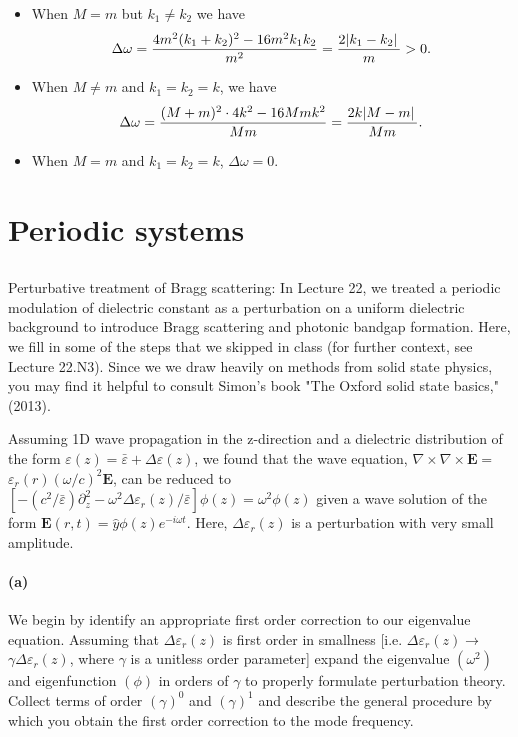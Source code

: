 \documentclass[hyperref, a4paper]{article}
\begin{document}
\begin{itemize}
    \item When $M = m$ but $k_1 \neq k_2$ we have 
    \begin{equation}
        \Delta \omega = \frac{
            4m^2 (k_1 + k_2)^2 - 16 m^2 k_1 k_2
        }{m^2}
        = \frac{2 \abs*{k_1 - k_2}}{m} > 0.
    \end{equation}
    \item When $M \neq m$ and $k_1 = k_2 = k$, we have 
    \begin{equation}
        \Delta \omega = \frac{
            (M + m)^2 \cdot 4 k^2 - 16 Mm k^2
        }{Mm} = \frac{2 k \abs*{M - m}}{Mm}.
    \end{equation}
    \item When $M = m$ and $k_1 = k_2 = k$, $\Delta \omega = 0$.
\end{itemize}

\section{Periodic systems}

\subsection{}

Perturbative treatment of Bragg scattering: In Lecture 22, we treated a periodic modulation of dielectric constant as a perturbation on a uniform dielectric background to introduce Bragg scattering and photonic bandgap formation. Here, we fill in some of the steps that we skipped in class (for further context, see Lecture 22.N3). Since we we draw heavily on methods from solid state physics, you may find it helpful to consult Simon's book "The Oxford solid state basics," (2013).

Assuming 1D wave propagation in the z-direction and a dielectric distribution of the form $\varepsilon(z)=\bar{\varepsilon}+\Delta \varepsilon(z)$, we found that the wave equation, $\nabla \times \nabla \times \mathbf{E}=$ $\varepsilon_r(r)(\omega / c)^2 \mathbf{E}$, can be reduced to $\left[-\left(c^2 / \bar{\varepsilon}\right) \partial_z^2-\omega^2 \Delta \varepsilon_r(z) / \bar{\varepsilon}\right] \phi(z)=\omega^2 \phi(z)$ given a
wave solution of the form $\mathbf{E}(r, t)=\hat{y} \phi(z) e^{-i \omega t}$. Here, $\Delta \varepsilon_r(z)$ is a perturbation with very small amplitude.

\paragraph*{(a)} We begin by identify an appropriate first order correction to our eigenvalue equation. Assuming that $\Delta \varepsilon_r(z)$ is first order in smallness [i.e. $\Delta \varepsilon_r(z) \rightarrow$ $\gamma \Delta \varepsilon_r(z)$, where $\gamma$ is a unitless order parameter] expand the eigenvalue $\left(\omega^2\right)$ and eigenfunction $(\phi)$ in orders of $\gamma$ to properly formulate perturbation theory. Collect terms of order $(\gamma)^0$ and $(\gamma)^1$ and describe the general procedure by which you obtain the first order correction to the mode frequency.
\end{document}
